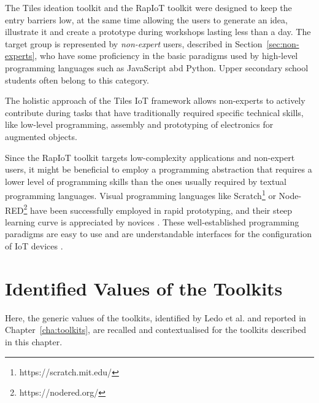 The Tiles ideation toolkit and the RapIoT toolkit were designed to keep the entry barriers low, at the same time allowing the users to generate an idea, illustrate it and create a prototype during workshops lasting less than a day.
The target group is represented by \textit{non-expert} users, described in Section~\ref{sec:non-experts}, who have some proficiency in the basic paradigms used by high-level programming languages such as JavaScript abd Python. Upper secondary school students often belong to this category.

The holistic approach of the Tiles IoT framework allows non-experts to actively contribute during tasks that have traditionally required specific technical skills, like low-level programming, assembly and prototyping of electronics for augmented objects.

Since the RapIoT toolkit targets low-complexity applications and non-expert users, it might be beneficial to employ a programming abstraction that requires a lower level of programming skills than the ones usually required by textual programming languages. Visual programming languages like Scratch\footnote{https://scratch.mit.edu/} or Node-RED\footnote{https://nodered.org/} have been successfully employed in rapid prototyping, and their steep learning curve is appreciated by novices \autocite{booth_end-user_2013}. These well-established programming paradigms are easy to use and are understandable interfaces for the configuration of IoT devices \autocite{houben_physikit_2016}.


\section{Identified Values of the Toolkits}

Here, the generic values of the toolkits, identified by Ledo et al. \autocite*{ledo_evaluation_2018} and reported in Chapter~\ref{cha:toolkits}, are recalled and contextualised for the toolkits described in this chapter.

